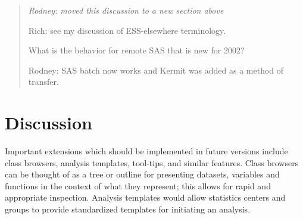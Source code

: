 \documentclass{article}
\newcommand*{\SAS}{\textsc{SAS}}
\newenvironment{Comment}{\begin{quote}\small\itshape }{\end{quote}}
\begin{document}
\begin{Comment}
Rodney: moved this discussion to a new section above

Rich: see my discussion of ESS-elsewhere terminology.

What is the behavior for remote SAS that is new for 2002?

Rodney: SAS batch now works and Kermit was added as a method of transfer.
\end{Comment}


\section{Discussion}
\label{sec:discussion}


Important extensions which should be implemented in future
versions include class browsers, analysis templates, tool-tips, and
similar features.  Class browsers can be thought of as a tree or
outline for presenting datasets, variables and functions in the
context of what they represent; this allows for rapid and appropriate
inspection.  Analysis templates would allow statistics centers and
groups to provide standardized templates for initiating an analysis.
\end{document}
